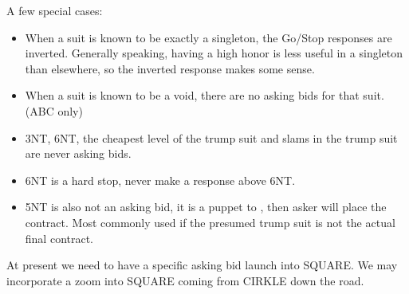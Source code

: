 \documentclass[tom-ari]{subfile}
\begin{document}
A few special cases:  

\begin{itemize}
	\item When a suit is known to be exactly a singleton, the Go/Stop responses are inverted.  Generally speaking, having a high honor is less useful in a singleton than elsewhere, so the inverted response makes some sense. 
	\item When a suit is known to be a void, there are no asking bids for that suit. (ABC only)
	\item 3NT, 6NT, the cheapest level of the trump suit and slams in the trump suit are never asking bids.
	\item 6NT is a hard stop, never make a response above 6NT.  
	\item 5NT is also not an asking bid, it is a puppet to , then asker will place the contract.  Most commonly used if the presumed trump suit is not the actual final contract.
\end{itemize}

At present we need to have a specific asking bid launch into SQUARE.  We may incorporate a zoom into SQUARE coming from CIRKLE down the road.
	
\end{document}
